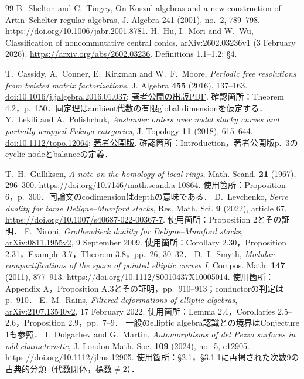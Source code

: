\documentclass[11pt,a4paper]{ltjsarticle}
\begin{document}
\begin{thebibliography}{99}
 B.~Shelton and C.~Tingey,
On Koszul algebras and a new construction of Artin--Schelter regular algebras,
J. Algebra 241 (2001), no.~2, 789--798.
\url{https://doi.org/10.1006/jabr.2001.8781}.
 H.~Hu, I.~Mori and W.~Wu,
Classification of noncommutative central conics,
arXiv:2602.03236v1 (3 February 2026).
\url{https://arxiv.org/abs/2602.03236}.
Definitions 1.1--1.2; \S4.

 T.~Cassidy, A.~Conner, E.~Kirkman and W.~F.~Moore,
\emph{Periodic free resolutions from twisted matrix factorizations},
J. Algebra \textbf{455} (2016), 137--163.
\href{https://doi.org/10.1016/j.jalgebra.2016.01.037}{doi:10.1016/j.jalgebra.2016.01.037};
\href{https://users.wfu.edu/moorewf/Papers/twistedMFs.pdf}{著者公開の出版PDF}.
確認箇所：Theorem 4.2，p.~150．同定理はambient代数の有限global dimensionを仮定する．
 Y.~Lekili and A.~Polishchuk,
\emph{Auslander orders over nodal stacky curves and partially wrapped Fukaya categories},
J. Topology \textbf{11} (2018), 615--644.
\href{https://doi.org/10.1112/topo.12064}{doi:10.1112/topo.12064};
\href{https://lekili.freemath.xyz/research/pwrap.pdf}{著者公開版}.
確認箇所：Introduction，著者公開版p.~3のcyclic nodeとbalanceの定義．

 T.~H.~Gulliksen,
\emph{A note on the homology of local rings}, Math. Scand. \textbf{21} (1967), 296--300.
\url{https://doi.org/10.7146/math.scand.a-10864}.
使用箇所：Proposition 6，p.~300．同論文のcodimensionはdepthの意味である．
 D.~Levchenko,
\emph{Serre duality for tame Deligne--Mumford stacks}, Res. Math. Sci. \textbf{9} (2022), article 67.
\url{https://doi.org/10.1007/s40687-022-00367-7}.
使用箇所：Proposition 2とその証明．
 F.~Nironi,
\emph{Grothendieck duality for Deligne--Mumford stacks},
\href{https://arxiv.org/abs/0811.1955v2}{arXiv:0811.1955v2}, 9 September 2009.
使用箇所：Corollary 2.30，Proposition 2.31，Example 3.7，Theorem 3.8，pp.~26, 30--32．
 D.~I.~Smyth,
\emph{Modular compactifications of the space of pointed elliptic curves I},
Compos. Math. \textbf{147} (2011), 877--913.
\url{https://doi.org/10.1112/S0010437X10005014}.
使用箇所：Appendix A，Proposition A.3とその証明，pp.~910--913；conductorの判定はp.~910．
 E.~M.~Rains,
\emph{Filtered deformations of elliptic algebras},
\href{https://arxiv.org/abs/2107.13540v2}{arXiv:2107.13540v2}, 17 February 2022.
使用箇所：Lemma 2.4，Corollaries 2.5--2.6，Proposition 2.9，pp.~7--9．
一般のelliptic algebra認識との境界はConjecture 1も参照．
 I.~Dolgachev and G.~Martin,
\emph{Automorphisms of del Pezzo surfaces in odd characteristic},
J. London Math. Soc. \textbf{109} (2024), no.~5, e12905.
\url{https://doi.org/10.1112/jlms.12905}.
使用箇所：\S2.1，\S3.1.1に再掲された次数9の古典的分類（代数閉体，標数$\ne2$）．


\end{thebibliography}
\end{document}
